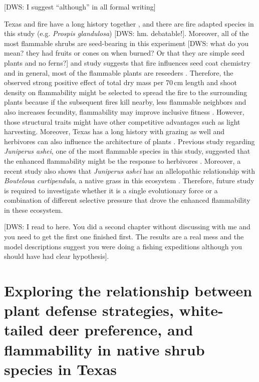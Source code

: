 \documentclass[12pt]{report}
\begin{document}
[DWS: I suggest ``although'' in all formal writing]

Texas and fire have a long history together \citep{moir1982firehistory, stambaugh2011firehistory,stambaugh2014historicalfirehistory,smeins2005historyoffire1}, and there are fire adapted species in this study (e.g. \emph{Prospis glandulosa}) \citep{glandulosahoney,wright1976effect} [DWS: hm. debatable!]. Moreover, all of the most flammable shrubs are seed-bearing in this experiment [DWS: what do you mean? they had fruits or cones on when burned? Or that they are simple seed plants and no ferns?] and study suggests that fire influences seed coat chemistry \citep{mcinnes2022doesseedcoatchemistry} and in general, most of the flammable plants are reseeders \citep{midgley2011pushingreseeders}. Therefore,  the observed strong positive effect of total dry mass per 70\,cm length and shoot density on flammability might be selected to spread the fire to the surrounding plants because if the subsequent fires kill nearby, less flammable neighbors and also increases fecundity, flammability may improve inclusive fitness \citep{bond1995kill}. However, those structural traits might have other competitive advantages such as light harvesting. Moreover, Texas has a long history with grazing as well and herbivores can also influence the architecture of plants \citep{danell1994browseeffects}. Previous study regarding \emph{Juniperus ashei}, one of the most flammable species in this study, suggested that the enhanced flammability might be the response to herbivores \citep{owens1998seasonal}. Moreover, a recent study also shows that \emph{Juniperus ashei} has an allelopathic relationship with \emph{Bouteloua curtipendula}, a native grass in this ecosystem \citep{young2009assessmentallelopathy}. Therefore, future study is required to investigate whether it is a single evolutionary force or a combination of different selective pressure that drove the enhanced flammability in these ecosystem.

[DWS: I read to here. You did a second chapter without discussing with me and you need to get the first one finished first. The results are a real mess and the model descriptions suggest you were doing a fishing expeditions although you should have had clear hypothesis].

\chapter{Exploring the relationship between plant defense strategies, white-tailed deer preference, and flammability in native shrub species in Texas} 
\end{document}
